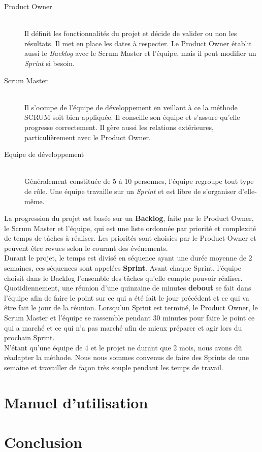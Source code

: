 \documentclass[11pt]{article}
\begin{document}
\begin{description}
	\item[Product Owner] \hfill \\
		Il définit les fonctionnalités du projet et décide de valider ou non les résultats. Il met en place les dates à respecter. Le Product Owner établit aussi le \textit{Backlog} avec le Scrum Master et l'équipe, mais il peut modifier un \textit{Sprint} si besoin.
	\item[Scrum Master] \hfill \\
		Il s'occupe de l'équipe de développement en veillant à ce la méthode SCRUM soit bien appliquée. Il conseille son équipe et s'assure qu'elle progresse correctement. Il gère aussi les relations extérieures, particulièrement avec le Product Owner.
	\item[Equipe de développement] \hfill \\
		Généralement constituée de 5 à 10 personnes, l'équipe regroupe tout type de rôle. Une équipe travaille sur un \textit{Sprint} et est libre de s'organiser d'elle-même.
\end{description}

La progression du projet est basée sur un \textbf{Backlog}, faite par le Product Owner, le Scrum Master et l'équipe, qui est une liste ordonnée par priorité et complexité de temps de tâches à réaliser. Les priorités sont choisies par le Product Owner et peuvent être revues selon le courant des événements. \\

Durant le projet, le temps est divisé en séquence ayant une durée moyenne de 2 semaines, ces séquences sont appelées \textbf{Sprint}. Avant chaque Sprint, l'équipe choisit dans le Backlog l'ensemble des tâches qu'elle compte pouvoir réaliser. \\

Quotidiennement, une réunion d'une quinzaine de minutes \textbf{debout} se fait dans l'équipe afin de faire le point sur ce qui a été fait le jour précédent et ce qui va être fait le jour de la réunion. Lorsqu'un Sprint est terminé, le Product Owner, le Scrum Master et l'équipe se rassemble pendant 30 minutes pour faire le point ce qui a marché et ce qui n'a pas marché afin de mieux préparer et agir lors du prochain Sprint. \\

N'étant qu'une équipe de 4 et le projet ne durant que 2 mois, nous avons dû réadapter la méthode. Nous nous sommes convenus de faire des Sprints de une semaine et travailler de façon très souple pendant les temps de travail.

\section{Manuel d'utilisation}

\section{Conclusion}
\end{document}
